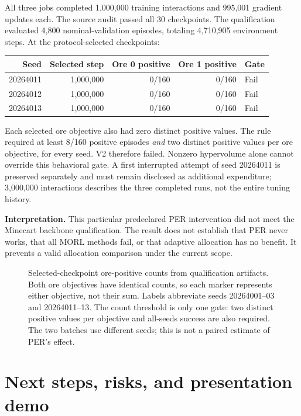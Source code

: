 All three jobs completed 1,000,000 training interactions and 995,001 gradient
updates each. The source audit passed all 30 checkpoints. The qualification
evaluated 4,800 nominal-validation episodes, totaling 4,710,905 environment
steps. At the protocol-selected checkpoints:

\begin{center}
\begin{tabular}{@{}rrrrl@{}}
\toprule
\textbf{Seed} & \textbf{Selected step} & \textbf{Ore 0 positive} &
\textbf{Ore 1 positive} & \textbf{Gate} \\
\midrule
20264011 & 1,000,000 & 0/160 & 0/160 & Fail \\
20264012 & 1,000,000 & 0/160 & 0/160 & Fail \\
20264013 & 1,000,000 & 0/160 & 0/160 & Fail \\
\bottomrule
\end{tabular}
\end{center}

Each selected ore objective also had zero distinct positive values. The rule
required at least 8/160 positive episodes \emph{and} two distinct positive
values per ore objective, for every seed. V2 therefore failed. Nonzero
hypervolume alone cannot override this behavioral gate. A first interrupted
attempt of seed 20264011 is preserved separately and must remain disclosed as
additional expenditure; 3,000,000 interactions describes the three completed
runs, not the entire tuning history.

\textbf{Interpretation.} This particular predeclared PER intervention did not
meet the Minecart backbone qualification. The result does not establish that
PER never works, that all MORL methods fail, or that adaptive allocation has
no benefit. It prevents a valid allocation comparison under the current scope.

\begin{figure}[htbp]
\centering

\caption{Selected-checkpoint ore-positive counts from qualification artifacts.
Both ore objectives have identical counts, so each marker represents either
objective, not their sum. Labels abbreviate seeds 20264001--03 and 20264011--13.
The count threshold is only one gate: two distinct positive values per objective
and all-seeds success are also required. The two batches use different seeds;
this is not a paired estimate of PER's effect.}
\end{figure}

\clearpage
\section{Next steps, risks, and presentation demo}

